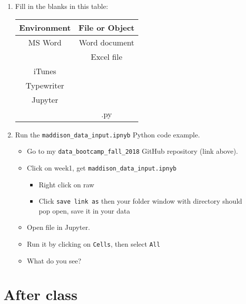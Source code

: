 \begin{enumerate}

\item Fill in the blanks in this table:

\begin{center}
\begin{tabular}{cc}
\toprule
Environment & File or Object \\
\midrule
MS Word  & Word document  \\
 & Excel file     \\
iTunes & \\
Typewriter & \\
Jupyter & \\
 & .py \\
\bottomrule
\end{tabular}
\end{center}

\item Run the \verb|maddison_data_input.ipnyb| Python code example.
\begin{itemize}
\item Go to my \verb|data_bootcamp_fall_2018| GitHub repository (link above).
\item Click on week1, get \verb|maddison_data_input.ipnyb|
\begin{itemize}
\item Right click on raw
\item Click \verb|save link as| then your folder window with directory should pop open, save it in your data
\end{itemize}
\item Open file in Jupyter.
\item Run it by clicking on \verb|Cells|, then select \verb|All|
\item What do you see?
\end{itemize}

\end{enumerate}

\section*{After class}

